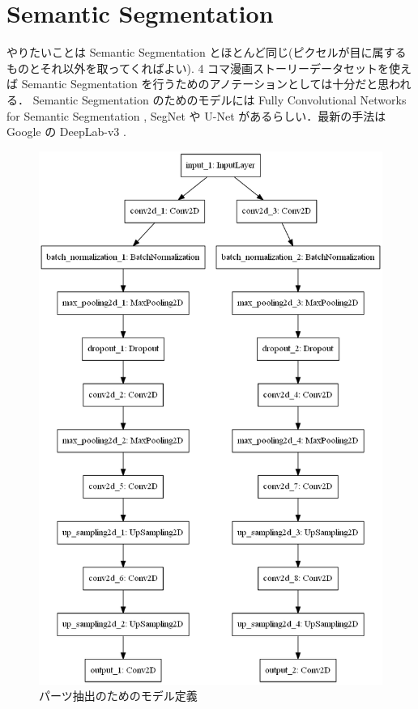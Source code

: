 \documentclass[onecolumn]{ujarticle}     %
\begin{document}
	\section{Semantic Segmentation}
	やりたいことは Semantic Segmentation とほとんど同じ(ピクセルが目に属するものとそれ以外を取ってくればよい).
	4 コマ漫画ストーリーデータセットを使えば Semantic Segmentation を行うためのアノテーションとしては十分だと思われる．
	Semantic Segmentation のためのモデルには Fully Convolutional Networks for Semantic Segmentation \cite{DBLP:journals/corr/LongSD14}, SegNet \cite{badrinarayanan2015segnet2} や U-Net \cite{DBLP:journals/corr/RonnebergerFB15} があるらしい．最新の手法は Google の DeepLab-v3 \cite{DBLP:journals/corr/abs-1802-02611}.
	\begin{figure}[h]
		\begin{center}
			\vspace{-10mm}
			\hspace*{30mm}
			\includegraphics[width=0.9\columnwidth]{model_structure.png}
			\caption{パーツ抽出のためのモデル定義}
			\label{fig:model}
		\end{center}
	\end{figure}
\end{document}
